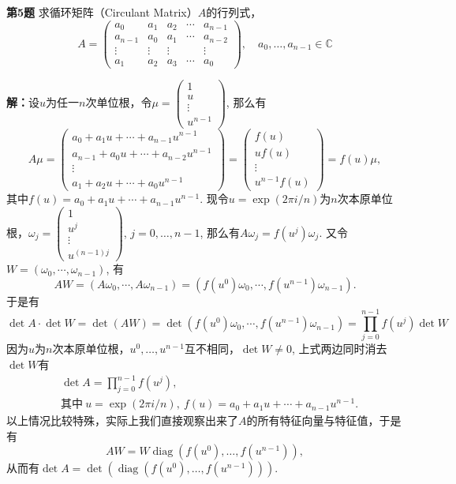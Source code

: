 \newpageorvspace

{\bf 第5题} 求循环矩阵（Circulant Matrix）$A$的行列式，
$$A = \begin{pmatrix} a_0 & a_1 & a_2 & \cdots & a_{n-1} \\ a_{n-1} & a_0 & a_1 & \cdots & a_{n-2} \\ \vdots & \vdots & \vdots & & \vdots \\ a_1 & a_2 & a_3 & \cdots & a_0 \end{pmatrix}, \quad a_0,\ldots,a_{n-1} \in \mathbb{C}$$

{\bf 解：}设$u$为任一$n$次单位根，令$\mu = \begin{pmatrix} 1 \\ u \\ \vdots \\ u^{n-1} \end{pmatrix}$, 那么有
$$A\mu = \begin{pmatrix} a_0 + a_1u + \cdots + a_{n-1}u^{n-1} \\ a_{n-1} + a_0u + \cdots + a_{n-2}u^{n-1} \\ \vdots \\ a_1 + a_2u + \cdots + a_0u^{n-1} \end{pmatrix} = \begin{pmatrix} f(u) \\ uf(u) \\ \vdots \\ u^{n-1}f(u) \end{pmatrix} = f(u)\mu,$$
其中$f(u) = a_0 + a_1u + \cdots + a_{n-1}u^{n-1}$. 现令$u = \exp(2\pi i/n)$为$n$次本原单位根，$\omega_j = \begin{pmatrix} 1 \\ u^j \\ \vdots \\ u^{(n-1)j} \end{pmatrix}$, $j=0,\ldots,n-1$, 那么有$A\omega_j = f(u^j)\omega_j$. 又令$W = (\omega_0, \cdots, \omega_{n-1})$, 有
$$AW = (A\omega_0, \cdots, A\omega_{n-1}) = (f(u^0)\omega_0, \cdots, f(u^{n-1})\omega_{n-1}).$$
于是有
$$\det A \cdot \det W = \det(AW) = \det(f(u^0)\omega_0, \cdots, f(u^{n-1})\omega_{n-1}) = \prod_{j=0}^{n-1}f(u^j) \det W$$
因为$u$为$n$次本原单位根，$u^0, \ldots, u^{n-1}$互不相同，$\det W \neq 0$, 上式两边同时消去$\det W$有
\begin{align*}
& \det A = \prod_{j=0}^{n-1}f(u^j), \\
& \text{其中}\  u = \exp(2\pi i/n), \ f(u) = a_0 + a_1u + \cdots + a_{n-1}u^{n-1}.
\end{align*}
以上情况比较特殊，实际上我们直接观察出来了$A$的所有特征向量与特征值，于是有
$$AW = W\operatorname{diag}(f(u^0), \ldots, f(u^{n-1})),$$
从而有$\det A = \det(\operatorname{diag}(f(u^0), \ldots, f(u^{n-1})))$.


